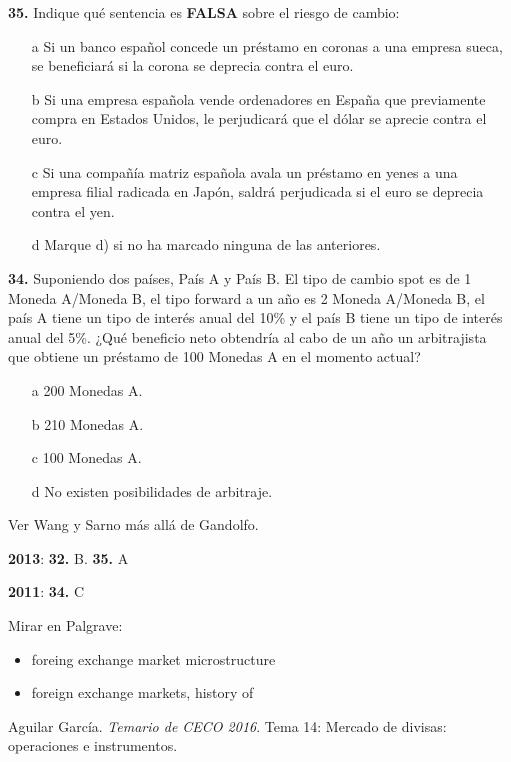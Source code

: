 \documentclass{nuevotema}
\begin{document}
\textbf{35.} Indique qué sentencia es \textbf{FALSA} sobre el riesgo de cambio:

\begin{enumerate}
	\item[a] Si un banco español concede un préstamo en coronas a una empresa sueca, se beneficiará si la corona se deprecia contra el euro.
	\item[b] Si una empresa española vende ordenadores en España que previamente compra en Estados Unidos, le perjudicará que el dólar se aprecie contra el euro.
	\item[c] Si una compañía matriz española avala un préstamo en yenes a una empresa filial radicada en Japón, saldrá perjudicada si el euro se deprecia contra el yen.
	\item[d] Marque d) si no ha marcado ninguna de las anteriores. 
\end{enumerate}


\textbf{34.} Suponiendo dos países, País A y País B. El tipo de cambio spot es de 1 Moneda A/Moneda B, el tipo forward a un año es 2 Moneda A/Moneda B, el país A tiene un tipo de interés anual del 10\% y el país B tiene un tipo de interés anual del 5\%. ¿Qué beneficio neto obtendría al cabo de un año un arbitrajista que obtiene un préstamo de 100 Monedas A en el momento actual?
\begin{enumerate}
	\item[a] 200 Monedas A.
	\item[b] 210 Monedas A.
	\item[c] 100 Monedas A.
	\item[d] No existen posibilidades de arbitraje.
\end{enumerate}

\notas

Ver Wang y Sarno más allá de Gandolfo.

\textbf{2013}: \textbf{32.} B. \textbf{35.} A

\textbf{2011}: \textbf{34.} C

\bibliografia

Mirar en Palgrave:
\begin{itemize}
    \item foreing exchange market microstructure
    \item foreign exchange markets, history of
\end{itemize}

Aguilar García. \textit{Temario de CECO 2016}. Tema 14: Mercado de divisas: operaciones e instrumentos.
\end{document}
